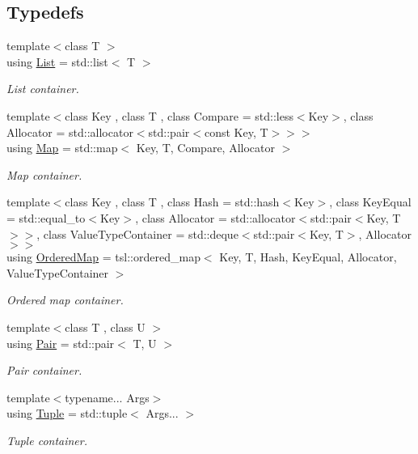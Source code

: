 \subsection*{Typedefs}
\begin{DoxyCompactItemize}
\item 
{\footnotesize template$<$class T $>$ }\\using \hyperlink{namespacelibrary_1_1core_1_1ctnr_a87ccf40619002299b341a5e76e989912}{List} = std\+::list$<$ T $>$
\begin{DoxyCompactList}\small\item\em List container. \end{DoxyCompactList}\item 
{\footnotesize template$<$class Key , class T , class Compare  = std\+::less$<$\+Key$>$, class Allocator  = std\+::allocator$<$std\+::pair$<$const Key, T$>$$>$$>$ }\\using \hyperlink{namespacelibrary_1_1core_1_1ctnr_a248e088a0b4ec44aff451a5c3663dcee}{Map} = std\+::map$<$ Key, T, Compare, Allocator $>$
\begin{DoxyCompactList}\small\item\em Map container. \end{DoxyCompactList}\item 
{\footnotesize template$<$class Key , class T , class Hash  = std\+::hash$<$\+Key$>$, class Key\+Equal  = std\+::equal\+\_\+to$<$\+Key$>$, class Allocator  = std\+::allocator$<$std\+::pair$<$\+Key, T$>$$>$, class Value\+Type\+Container  = std\+::deque$<$std\+::pair$<$\+Key, T$>$, Allocator$>$$>$ }\\using \hyperlink{namespacelibrary_1_1core_1_1ctnr_a1c0809231c3bc9fccce602bd7941a36b}{Ordered\+Map} = tsl\+::ordered\+\_\+map$<$ Key, T, Hash, Key\+Equal, Allocator, Value\+Type\+Container $>$
\begin{DoxyCompactList}\small\item\em Ordered map container. \end{DoxyCompactList}\item 
{\footnotesize template$<$class T , class U $>$ }\\using \hyperlink{namespacelibrary_1_1core_1_1ctnr_aad6f8de4c0f279c10436d59d4ace74bd}{Pair} = std\+::pair$<$ T, U $>$
\begin{DoxyCompactList}\small\item\em Pair container. \end{DoxyCompactList}\item 
{\footnotesize template$<$typename... Args$>$ }\\using \hyperlink{namespacelibrary_1_1core_1_1ctnr_a551ef72e2adb570c4d6bdf5e1bbc96b9}{Tuple} = std\+::tuple$<$ Args... $>$
\begin{DoxyCompactList}\small\item\em Tuple container. \end{DoxyCompactList}\end{DoxyCompactItemize}

